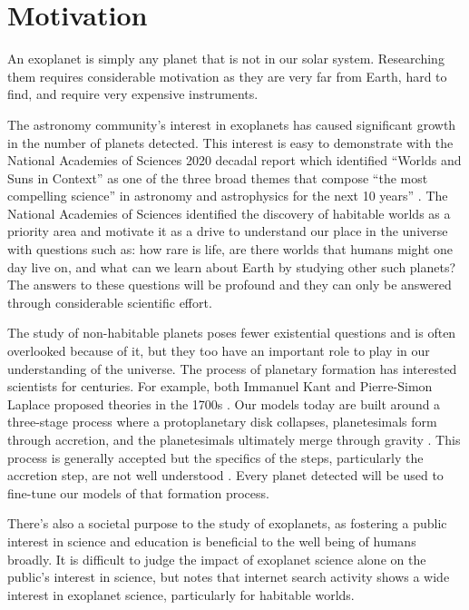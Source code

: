 \section{Motivation}
\label{sec:motivation}

An exoplanet is simply any planet that is not in our solar system. Researching
them requires considerable motivation as they are very far from Earth,
hard to find, and require very expensive instruments. 

The astronomy community's interest in exoplanets has caused significant growth
in the number of planets detected. This interest is easy to demonstrate with
the National Academies of Sciences 2020 decadal report which identified
``Worlds and Suns in Context'' as one of the three broad themes that compose
``the most compelling science'' in astronomy and astrophysics for the next 10
years'' \citep{nationalacademiesofsciencesPathwaysDiscoveryAstronomy2021}. The
National Academies of Sciences identified the discovery of habitable worlds as
a priority area and motivate it as a drive to understand our place in the
universe with questions such as: how rare is life, are there worlds that humans
might one day live on, and what can we learn about Earth by studying other such
planets? The answers to these questions will be profound and they can only be
answered through considerable scientific effort.

The study of non-habitable planets poses fewer existential questions and is
often overlooked because of it, but they too have an important role to play in
our understanding of the universe. The process of planetary formation has
interested scientists for centuries. For example, both Immanuel Kant and
Pierre-Simon Laplace proposed theories in the 1700s \citep{Perryman2018a}. Our
models today are built around a three-stage process where a protoplanetary disk
collapses, planetesimals form through accretion, and the planetesimals
ultimately merge through gravity \citep{Jeffery}. This process is generally
accepted but the specifics of the steps, particularly the accretion step, are
not well understood \citep{Perryman2018a}. Every planet detected will be used
to fine-tune our models of that formation process.

There's also a societal purpose to the study of exoplanets, as fostering a
public interest in science and education is beneficial to the well being of
humans broadly. It is difficult to judge the impact of exoplanet science alone
on the public's interest in science, but \citet{deegImpactExoplanet2018} notes
that internet search activity shows a wide interest in exoplanet science,
particularly for habitable worlds.

